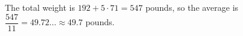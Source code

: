 The total weight is $192+5\cdot71=547$ pounds, so the average is $\dfrac{547}{11}=49.72\ldots\approx\boxed{49.7}$ pounds.
